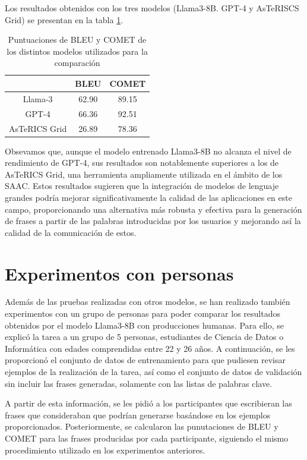 \documentclass[11pt,spanish,listoffigures,listoftables]{tfgetsinf}
\begin{document}
Los resultados obtenidos con los tres modelos (Llama3-8B. GPT-4 y AsTeRISCS Grid) se presentan en la tabla \ref{tab:comparacionFinal}.

\begin{table}[!h]
\caption{Puntuaciones de BLEU y COMET de los distintos modelos utilizados para la comparación}
\begin{center}
\begin{tabular}{ c | c c }
	\ & BLEU & COMET \\
	\hline
	\hline
	Llama-3 & 62.90 & 89.15  \\
	GPT-4 & 66.36 & 92.51\\
	AsTeRICS Grid & 26.89 & 78.36 \\

\end{tabular}
\end{center}
\label{tab:comparacionFinal}
\end{table}

Obsevamos que, aunque el modelo entrenado Llama3-8B no alcanza el nivel de rendimiento de GPT-4, sus resultados son notablemente superiores a los de AsTeRICS Grid, una herramienta ampliamente utilizada en el ámbito de los SAAC. Estos resultados sugieren que la integración de modelos de lenguaje grandes podría mejorar significativamente la calidad de las aplicaciones en este campo, proporcionando una alternativa más robusta y efectiva para la generación de frases a partir de las palabras introducidas por los usuarios y mejorando así la calidad de la comunicación de estos.

\section{Experimentos con personas}

Además de las pruebas realizadas con otros modelos, se han realizado también experimentos con un grupo de personas para poder comparar los resultados obtenidos por el modelo Llama3-8B con producciones humanas. Para ello, se explicó la tarea a un grupo de 5 personas, estudiantes de Ciencia de Datos o Informática con edades comprendidas entre 22 y 26 años. A continuación, se les proporcionó el conjunto de datos de entrenamiento para que pudiesen revisar ejemplos de la realización de la tarea, así como el conjunto de datos de validación sin incluir las frases generadas, solamente con las listas de palabras clave.

A partir de esta información, se les pidió a los participantes que escribieran las frases que consideraban que podrían generarse basándose en los ejemplos proporcionados. Posteriormente, se calcularon las punutaciones de BLEU y COMET para las frases producidas por cada participante, siguiendo el mismo procedimiento utilizado en los experimentos anteriores.
\end{document}

